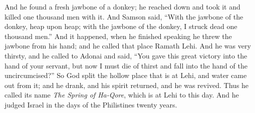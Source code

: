 \begin{biblechapter}
\verse And he found a fresh jawbone of a donkey; he reached down and took it and killed one thousand men with it.
\verse And Samson said, “With the jawbone of the donkey, 
heap upon heap; 
with the jawbone of the donkey, 
I struck dead one thousand men.”
\verse And it happened, when he finished speaking he threw the jawbone from his hand; and he called that place Ramath Lehi.
\verse And he was very thirsty, and he called to Adonai and said, “You gave this great victory into the hand of your servant, but now I must die of thirst and fall into the hand of the uncircumcised?”
\verse So God split the hollow place that is at Lehi, and water came out from it; and he drank, and his spirit returned, and he was revived. Thus he called its name \textit{The Spring of Ha-Qore}, which is at Lehi to this day.
\verse And he judged Israel in the days of the Philistines twenty years.
\end{biblechapter}


